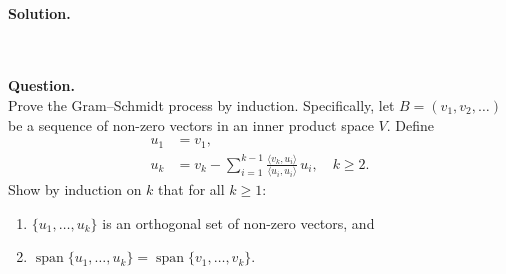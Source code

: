 \documentclass{article}
\begin{document}
\noindent\\
\textbf{Solution.}\\
\quad\\
\noindent{}

\bigskip

\hfill \break  $~\!\!$ \dotfill \medskip \\
\textbf{Question.}\\
Prove the Gram--Schmidt process by induction. Specifically, let $B = (v_1, v_2, \dots)$ be a sequence of non-zero vectors in an inner product space $V$. Define
\begin{align*}
u_1 &= v_1, \\
u_k &= v_k - \sum_{i=1}^{k-1} \frac{\langle v_k, u_i \rangle}{\langle u_i, u_i \rangle}\, u_i, \quad k \ge 2.
\end{align*}
Show by induction on $k$ that for all $k \ge 1$:
\begin{enumerate}
    \item $\{u_1, \dots, u_k\}$ is an orthogonal set of non-zero vectors, and
    \item $\operatorname{span}\{u_1, \dots, u_k\} = \operatorname{span}\{v_1, \dots, v_k\}$.
\end{enumerate}
\end{document}
